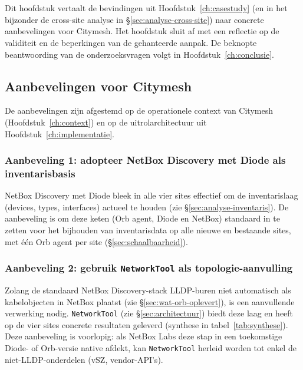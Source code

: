
\chapter{}%
\label{ch:analyse}

Dit hoofdstuk vertaalt de bevindingen uit Hoofdstuk~\ref{ch:casestudy} (en in het bijzonder de cross-site analyse in \S\ref{sec:analyse-cross-site}) naar concrete aanbevelingen voor Citymesh. Het hoofdstuk sluit af met een reflectie op de validiteit en de beperkingen van de gehanteerde aanpak. De beknopte beantwoording van de onderzoeksvragen volgt in Hoofdstuk~\ref{ch:conclusie}.

\section{Aanbevelingen voor Citymesh}
\label{sec:aanbevelingen}

De aanbevelingen zijn afgestemd op de operationele context van Citymesh (Hoofdstuk~\ref{ch:context}) en op de uitrolarchitectuur uit Hoofdstuk~\ref{ch:implementatie}.

\subsection{Aanbeveling 1: adopteer NetBox Discovery met Diode als inventarisbasis}

NetBox Discovery met Diode bleek in alle vier sites effectief om de inventarislaag (devices, types, interfaces) actueel te houden (zie \S\ref{sec:analyse-inventaris}). De aanbeveling is om deze keten (Orb agent, Diode en NetBox) standaard in te zetten voor het bijhouden van inventarisdata op alle nieuwe en bestaande sites, met \'e\'en Orb agent per site (\S\ref{sec:schaalbaarheid}).

\subsection{Aanbeveling 2: gebruik \texttt{NetworkTool} als topologie-aanvulling}

Zolang de standaard NetBox Discovery-stack LLDP-buren niet automatisch als kabelobjecten in NetBox plaatst (zie \S\ref{sec:wat-orb-oplevert}), is een aanvullende verwerking nodig. \texttt{NetworkTool} (zie \S\ref{sec:architectuur}) biedt deze laag en heeft op de vier sites concrete resultaten geleverd (synthese in tabel~\ref{tab:synthese}). Deze aanbeveling is voorlopig: als NetBox Labs deze stap in een toekomstige Diode- of Orb-versie native afdekt, kan \texttt{NetworkTool} herleid worden tot enkel de niet-LLDP-onderdelen (vSZ, vendor-API's).

